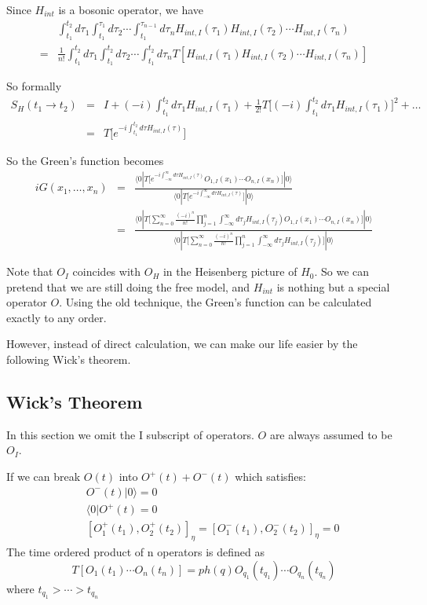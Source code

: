 \documentclass[12pt]{book}
\begin{document}
	Since $H_{int}$ is a bosonic operator, we have
	\begin{eqnarray}
		&\int_{t_1}^{t_2}d\tau_1\int_{t_1}^{\tau_1}d\tau_2\cdots\int_{t_1}^{\tau_{n-1}}d\tau_nH_{int,I}(\tau_1)H_{int,I}(\tau_2)\cdots H_{int,I}(\tau_n)\nonumber \\
		=&\frac 1{n!}\int_{t_1}^{t_2}d\tau_1\int_{t_1}^{t_2}d\tau_2\cdots\int_{t_1}^{t_2}d\tau_n T[H_{int,I}(\tau_1)H_{int,I}(\tau_2)\cdots H_{int,I}(\tau_n)]
	\end{eqnarray}
	
	So formally
	\begin{eqnarray}
		S_H(t_1\rightarrow t_2)&=&I+(-i)\int_{t_1}^{t_2}d\tau_1H_{int,I}(\tau_1)+\frac 1{2!}T\Big[(-i)\int_{t_1}^{t_2}d\tau_1H_{int,I}(\tau_1)\Big]^2+\dots\\
		&=&T\Big[e^{-i\int_{t_1}^{t_2}d\tau H_{int,I}(\tau)}\Big]
	\end{eqnarray}
	
	So the Green's function becomes
	\begin{eqnarray}
		iG(x_1,\dots,x_n)&=&\frac{\langle 0|T\big[e^{-i\int_{-\infty}^\infty d\tau H_{int,I}(\tau)}O_{1,I}(x_1)\cdots O_{n,I}(x_n)\big]|0\rangle}{\langle 0|T\big[e^{-i\int_{-\infty}^\infty d\tau H_{int,I}(\tau)}\big]|0\rangle}\\
		&=&\frac{\langle 0|T\big[\sum_{n=0}^\infty \frac{(-i)^n}{n!}\prod_{j=1}^n\int_{-\infty}^\infty d\tau_j H_{int,I}(\tau_j)O_{1,I}(x_1)\cdots O_{n,I}(x_n)\big]|0\rangle}{\langle 0|T\big[\sum_{n=0}^\infty\frac{(-i)^n}{n!}\prod_{j=1}^n\int_{-\infty}^\infty d\tau_j H_{int,I}(\tau_j)\big]|0\rangle}
	\end{eqnarray}
	
	Note that $O_I$ coincides with $O_H$ in the Heisenberg picture of $H_0$. So we can pretend that we are still doing the free model, and $H_{int}$ is nothing but a special operator $O$. Using the old technique, the Green's function can be calculated exactly to any order.
	
	However, instead of direct calculation, we can make our life easier by the following Wick's theorem.
	
	\subsection{Wick's Theorem}
	In this section we omit the I subscript of operators. $O$ are always assumed to be $O_I$.
	
	If we can break $O(t)$ into $O^+(t)+O^-(t)$ which satisfies:
	\begin{eqnarray}
		&&O^-(t)|0\rangle=0\\
		&&\langle 0|O^+(t)=0\\
		&&[O^+_1(t_1),O^+_2(t_2)]_\eta=[O^-_1(t_1),O^-_2(t_2)]_\eta=0 \label{eqn:wick_commute}
	\end{eqnarray}
	The time ordered product of n operators is defined as
	\begin{equation}
		T[O_1(t_1)\cdots O_n(t_n)]=ph(q)O_{q_1}(t_{q_1})\cdots O_{q_n}(t_{q_n})
	\end{equation}
	where $t_{q_1}>\cdots>t_{q_n}$
	
\end{document}
